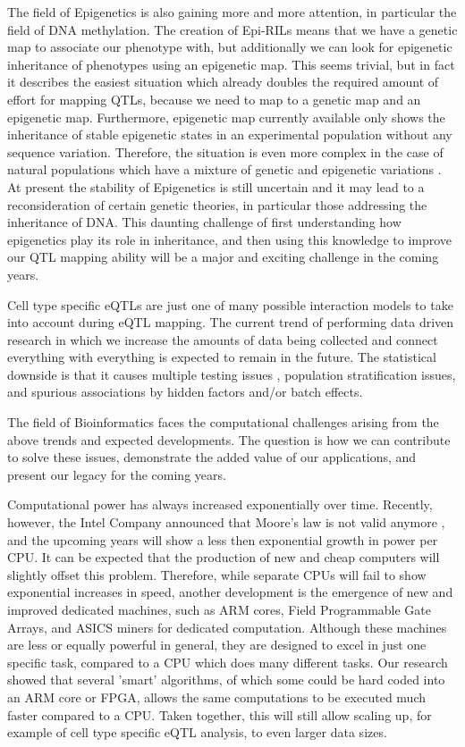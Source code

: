 The field of Epigenetics is also gaining more and more attention, in particular the field of DNA methylation. The creation of Epi-RILs \cite{Johannes:2011} means 
that we have a genetic map to associate our phenotype with, but additionally we can look for epigenetic inheritance of phenotypes using an 
epigenetic map. This seems trivial, but in fact it describes the easiest situation which already doubles the required amount of effort for 
mapping QTLs, because we need to map to a genetic map and an epigenetic map. Furthermore, epigenetic map currently available only shows the 
inheritance of stable epigenetic states in an experimental population without any sequence variation. Therefore, the situation is even more 
complex in the case of natural populations which have a mixture of genetic and epigenetic variations \cite{Johannes:2014}. At present the 
stability of Epigenetics is still uncertain and it may lead to a reconsideration of certain genetic theories, in particular those addressing 
the inheritance of DNA. This daunting challenge of first understanding how epigenetics play its role in inheritance, and then using this 
knowledge to improve our QTL mapping ability will be a major and exciting challenge in the coming years.

Cell type specific eQTLs are just one of many possible interaction models to take into account during eQTL mapping. The current trend of 
performing data driven research in which we increase the amounts of data being collected and connect everything with everything is expected 
to remain in the future. The statistical downside is that it causes multiple testing issues \cite{Benjamini:2010}, population stratification issues, and 
spurious associations by hidden factors \cite{Huff:1993} and/or batch effects. 

The field of Bioinformatics faces the computational challenges arising from the above trends and expected developments. The question is how we 
can contribute to solve these issues, demonstrate the added value of our applications, and present our legacy for the coming years.

Computational power has always increased exponentially over time. Recently, however, the Intel Company announced that Moore's law is not valid 
anymore \cite{Editorial:2009, Shah:2013}, and the upcoming years will show a less then exponential growth in power per CPU. It can be expected 
that the production of new and cheap computers will slightly offset this problem. Therefore, while separate CPUs will fail to show exponential 
increases in speed, another development is the emergence of new and improved dedicated machines, such as ARM cores, Field Programmable Gate 
Arrays, and ASICS miners for dedicated computation. Although these machines are less or equally powerful in general, they are designed to excel 
in just one specific task, compared to a CPU which does many different tasks. Our research showed that several 'smart' algorithms, of which some 
could be hard coded into an ARM core or FPGA, allows the same computations to be executed much faster compared to a CPU. Taken together, this 
will still allow scaling up, for example of cell type specific eQTL analysis, to even larger data sizes.

